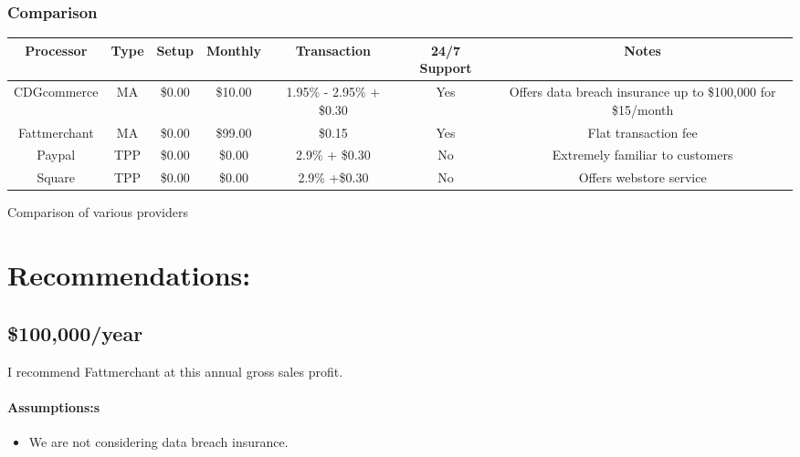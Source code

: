\documentclass[letterpaper]{article}
\begin{document}
      \subsubsection{Comparison}
        \begin{center}
         \centering
         \begin{tabular}{||c c c c c c c||}
         \hline
         Processor & Type & Setup & Monthly & Transaction & 24/7 Support & Notes\\ [0.5ex]
         \hline\hline
         CDGcommerce & MA & \$0.00 & \$10.00 & 1.95\% - 2.95\% + \$0.30 & Yes & Offers data breach insurance up to \$100,000 for \$15/month\\
         Fattmerchant & MA & \$0.00 & \$99.00 & \$0.15 & Yes & Flat transaction fee\\
         Paypal & TPP & \$0.00 & \$0.00 & 2.9\% + \$0.30 & No & Extremely familiar to customers\\
         Square & TPP & \$0.00 & \$0.00 & 2.9\% +\$0.30 & No & Offers webstore service\\ [1ex]
         \hline
        \end{tabular}
        \caption{Comparison of various providers}
        \label{table:1}
      \end{center}

  \section{Recommendations:}
    \subsection{\$100,000/year}
      I recommend Fattmerchant at this annual gross sales profit.
      \paragraph{Assumptions:s}
        \begin{itemize}
          \item We are not considering data breach insurance.
        \end{itemize}
\end{document}
